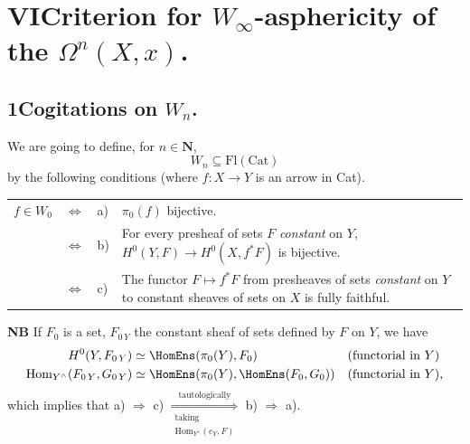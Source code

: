 

\section*{VI\quad Criterion for $W_\infty$-asphericity of the $\Omega^n(X,x)$.}

\subsection*{1\quad Cogitations on $W_n$.}

We are going to define, for $n \in \mathbf{N}$,
\[
W_n \subseteq \mathrm{Fl}(\mathrm{Cat})
\]
by the following conditions (where $f : X \longrightarrow Y$ is an arrow in Cat).

\noindent\begin{tabular}{@{}l c l >{\RaggedRight\arraybackslash}p{}@{}}
$f \in W_0$ & $\Longleftrightarrow$ & a) & $\pi_0(f)$ bijective.\\
 & $\Longleftrightarrow$ & b) & For every presheaf of sets $F$ \textit{constant} on $Y$, $H^0(Y,F) \longrightarrow H^0(X,f^*F)$ is bijective.\\
 & $\Longleftrightarrow$ & c) & The functor $F \longmapsto f^*F$ from presheaves of sets \textit{constant} on $Y$ to constant sheaves of sets on $X$ is fully faithful.
\end{tabular}



\textbf{NB} If $F_0$ is a set, $F_{0\,Y}$ the constant sheaf of sets defined by $F$ on $Y$, we have
\[
\begin{aligned}
H^0(Y,F_{0\,Y}) &\simeq \HomEns(\pi_0(Y),F_0) && \text{(functorial in $Y$)}\\
\mathrm{Hom}_{Y^\wedge}(F_{0\,Y},G_{0\,Y}) &\simeq \HomEns(\pi_0(Y),\HomEns(F_0,G_0)) && \text{(functorial in $Y$),}
\end{aligned}
\]
which implies that a) $\Longrightarrow$ c) $\underset{\substack{\text{taking}\\ \mathrm{Hom}_{Y^\wedge}(e_Y,F)}}{\overset{\text{tautologically}}{\Longrightarrow}}$ b) $\Longrightarrow$ a).

